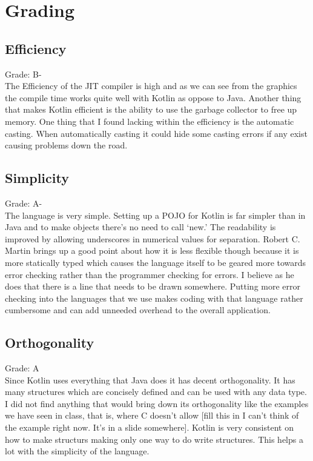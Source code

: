 \section{Grading}

\subsection{Efficiency}
Grade: B-
\\
The Efficiency of the JIT compiler is high and as we can see from the graphics the compile time works quite well with Kotlin as oppose to Java. Another thing that makes Kotlin efficient is the ability to use the garbage collector to free up memory. One thing that I found lacking within the efficiency is the automatic casting. When automatically casting it could hide some casting errors if any exist causing problems down the road.

\subsection{Simplicity}
Grade: A-
\\
The language is very simple. Setting up a POJO for Kotlin is far simpler than in Java and to make objects there's no need to call `new.' The readability is improved by allowing underscores in numerical values for separation. Robert C. Martin brings up a good point about how it is less flexible though because it is more statically typed which causes the language itself to be geared more towards error checking rather than the programmer checking for errors. I believe as he does that there is a line that needs to be drawn somewhere. Putting more error checking into the languages that we use makes coding with that language rather cumbersome and can add unneeded overhead to the overall application. 

\subsection{Orthogonality}
Grade: A
\\
Since Kotlin uses everything that Java does it has decent orthogonality. It has many structures which are concisely defined and can be used with any data type. I did not find anything that would bring down its orthogonality like the examples we have seen in class, that is, where C doesn't allow [fill this in I can't think of the example right now. It's in a slide somewhere]. Kotlin is very consistent on how to make structurs making only one way to do write structures. This helps a lot with the simplicity of the language. 
